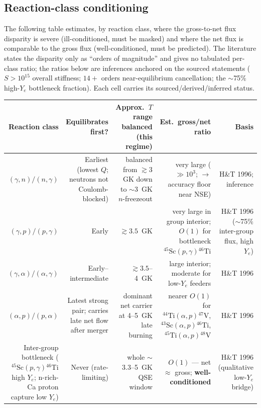 \documentclass[11pt]{article}
\newcommand{\nuc}[2]{\ensuremath{{}^{#2}\mathrm{#1}}}
\begin{document}
\subsection{Reaction-class conditioning}

The following table estimates, by reaction class, where the gross-to-net flux disparity is severe (ill-conditioned, must be masked) and where the net flux is comparable to the gross flux (well-conditioned, must be predicted). The literature states the disparity only as ``orders of magnitude'' and gives no tabulated per-class ratio; the ratios below are inferences anchored on the sourced statements ($S > 10^{15}$ overall stiffness; $14+$ orders near-equilibrium cancellation; the $\sim$75\% high-$Y_e$ bottleneck fraction). Each cell carries its sourced/derived/inferred status.

\begin{center}
\footnotesize
\setlength{\tabcolsep}{4pt}
\renewcommand{\arraystretch}{1.25}
\begin{tabularx}{\textwidth}{@{}R{0.82}R{0.88}R{1.35}R{1.1}R{0.85}@{}}
\toprule
\textbf{Reaction class} & \textbf{Equilibrates first?} & \textbf{Approx.\ $T$ range balanced (this regime)} & \textbf{Est.\ gross/net ratio} & \textbf{Basis} \\
\midrule
$(\gamma,n)/(n,\gamma)$ & Earliest (lowest $Q$; neutrons not Coulomb-blocked) & balanced from $\gtrsim 3$~GK down to $\sim 3$~GK $n$-freezeout & very large ($\gg 10^3$; $\to$ accuracy floor near NSE) & H\&T 1996; inference \\
$(\gamma,p)/(p,\gamma)$ & Early & $\gtrsim 3.5$~GK & very large in group interior; $O(1)$ for bottleneck $\nuc{Sc}{45}(p,\gamma)\nuc{Ti}{46}$ & H\&T 1996 ($\sim$75\% inter-group flux, high $Y_e$) \\
$(\gamma,\alpha)/(\alpha,\gamma)$ & Early--intermediate & $\gtrsim 3.5$--4~GK & large interior; moderate for low-$Y_e$ feeders & H\&T 1996 \\
$(\alpha,p)/(p,\alpha)$ & Latest strong pair; carries late net flow after merger & dominant net carrier at 4--5~GK late burning & nearer $O(1)$ for $\nuc{Ti}{44}(\alpha,p)\nuc{V}{47}$, $\nuc{Sc}{43}(\alpha,p)\nuc{Ti}{46}$, $\nuc{Ti}{45}(\alpha,p)\nuc{V}{48}$ & H\&T 1996 \\
Inter-group bottleneck ($\nuc{Sc}{45}(p,\gamma)\nuc{Ti}{46}$ high $Y_e$; n-rich-Ca proton capture low $Y_e$) & Never (rate-limiting) & whole $\sim$3.3--5~GK QSE window & $O(1)$ --- net $\approx$ gross; \textbf{well-conditioned} & H\&T 1996 (qualitative low-$Y_e$ bridge) \\
\bottomrule
\end{tabularx}
\end{center}
\end{document}
